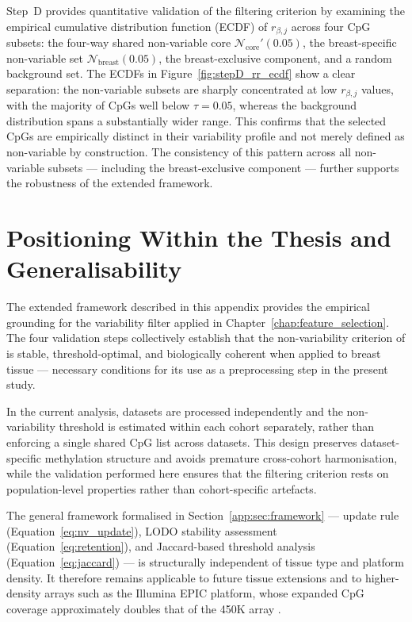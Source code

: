 Step~D provides quantitative validation of the filtering 
criterion by examining the empirical cumulative distribution 
function (ECDF) of $r_{\beta,j}$ across four CpG subsets: 
the four-way shared non-variable core 
$\mathcal{N}_{\mathrm{core}}'(0.05)$, the breast-specific 
non-variable set $\mathcal{N}_{\mathrm{breast}}(0.05)$, 
the breast-exclusive component, and a random background set.
The ECDFs in Figure~\ref{fig:stepD_rr_ecdf} show a 
clear separation: the non-variable subsets are sharply 
concentrated at low $r_{\beta,j}$ values, with the 
majority of CpGs well below $\tau = 0.05$, whereas 
the background distribution spans a substantially 
wider range. This confirms that the selected CpGs 
are empirically distinct in their variability profile 
and not merely defined as non-variable by construction. 
The consistency of this pattern across all non-variable 
subsets — including the breast-exclusive component — 
further supports the robustness of the extended 
framework.

\section{Positioning Within the Thesis and Generalisability}
\label{app:sec:positioning}

The extended framework described in this appendix 
provides the empirical grounding for the variability 
filter applied in Chapter~\ref{chap:feature_selection}. 
The four validation steps collectively establish that 
the non-variability criterion of \cite{Edgar2017} 
is stable, threshold-optimal, and biologically 
coherent when applied to breast tissue — necessary 
conditions for its use as a preprocessing step in 
the present study.

In the current analysis, datasets are processed 
independently and the non-variability threshold is 
estimated within each cohort separately, rather than 
enforcing a single shared CpG list across datasets. 
This design preserves dataset-specific methylation 
structure and avoids premature cross-cohort 
harmonisation, while the validation performed here 
ensures that the filtering criterion rests on 
population-level properties rather than 
cohort-specific artefacts.

The general framework formalised in 
Section~\ref{app:sec:framework} — update rule 
(Equation~\ref{eq:nv_update}), LODO stability 
assessment (Equation~\ref{eq:retention}), and 
Jaccard-based threshold analysis (Equation~\ref{eq:jaccard}) — 
is structurally independent of tissue type and 
platform density. It therefore remains applicable 
to future tissue extensions and to higher-density 
arrays such as the Illumina EPIC platform, whose 
expanded CpG coverage approximately doubles that 
of the 450K array \cite{Pidsley2016}.
